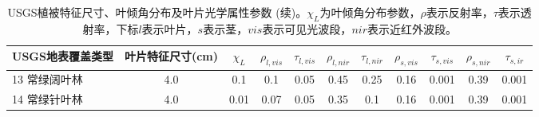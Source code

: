 \begin{sidewaystable}[]
    \centering
    \caption{USGS植被特征尺寸、叶倾角分布及叶片光学属性参数 (续)。$\chi_L$为叶倾角分布参数，$\rho$表示反射率，$\tau$表示透射率，下标$l$表示叶片，$s$表示茎，$vis$表示可见光波段，$nir$表示近红外波段。}
    \label{tab:USGS植被特征尺寸叶倾角分布及叶片光学属性参数2}
        \begin{tabular}{@{}lcccccccccc@{}}
        \toprule
        USGS地表覆盖类型     & 叶片特征尺寸(cm) & $\chi_L$ &$\rho_{l, vis}$ & $\tau_{l, v i s}$  &$\rho_{l,  nir}$ &$\tau_{l,  nir}$ & $\rho_{s, v i s}$ &$\tau_{s, v i s}$ &$\rho_{s,  nir}$ &$\tau_{s,ir}$\\ \midrule
        13 常绿阔叶林   & 4.0        & 0.1                                                                          & 0.1                                                                                                             & 0.05                                                                                                            & 0.45                                                                                                            & 0.25                                                                                                            & 0.16                                                                                                            & 0.001                                                                                                           & 0.39                                                                                                            & 0.001                                                                                                           \\
        14 常绿针叶林   & 4.0        & 0.01                                                                         & 0.07                                                                                                            & 0.05                                                                                                            & 0.35                                                                                                            & 0.1                                                                                                             & 0.16                                                                                                            & 0.001                                                                                                           & 0.39                                                                                                            & 0.001                                                                                                           \\

\end{tabular}
\end{sidewaystable}
